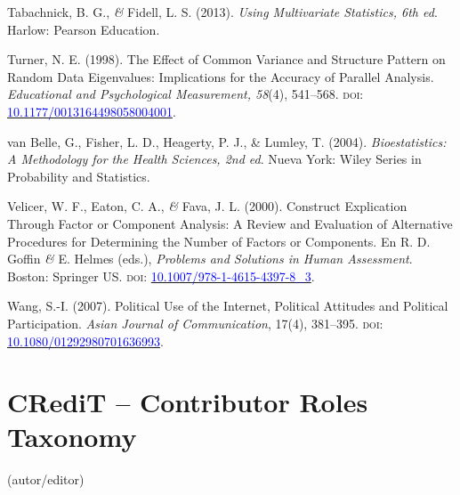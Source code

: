 \documentclass[a4paper]{tufte-handout}
\begin{document}
\begin{list}{}
\item{\small Tabachnick, B. G., {\itshape \&} Fidell, L. S. (2013). {\itshape Using Multivariate Statistics, 6th ed}. Harlow: Pearson Education.}

\item{\small Turner, N. E. (1998). The Effect of Common Variance and Structure Pattern on Random Data Eigenvalues: Implications for the Accuracy of Parallel Analysis. {\itshape Educational and Psychological Measurement, 58}(4), 541--568. {\scshape doi:} \href{https://doi.org/10.1177/0013164498058004001}{\textcolor{blue}{10.1177/0013164498058004001}}.}

\item{\small van Belle, G., Fisher, L. D., Heagerty, P. J., \& Lumley, T. (2004). {\itshape Bioestatistics: A Methodology for the Health Sciences, 2nd ed}. Nueva York: Wiley Series in Probability and Statistics.}

\item{\small Velicer, W. F., Eaton, C. A., {\itshape \&} Fava, J. L. (2000). Construct Explication Through Factor or Component Analysis: A Review and Evaluation of Alternative Procedures for Determining the Number of Factors or Components. En R. D. Goffin {\itshape \&} E. Helmes (eds.), {\itshape Problems and Solutions in Human Assessment}. Boston: Springer US. {\scshape doi:} \href{https://doi.org/10.1007/978-1-4615-4397-8_3}{\textcolor{blue}{10.1007/978-1-4615-4397-8\_3}}.}

\item{\small Wang, S.-I. (2007). Political Use of the Internet, Political Attitudes and Political Participation. {\itshape Asian Journal of Communication}, 17(4), 381--395. {\scshape doi:} \href{https://doi.org/10.1080/01292980701636993}{\textcolor{blue}{10.1080/01292980701636993}}.}

\end{list}


\section{{\normalfont CRediT -- Contributor Roles Taxonomy}}


{ (autor/editor)}
\end{document}
